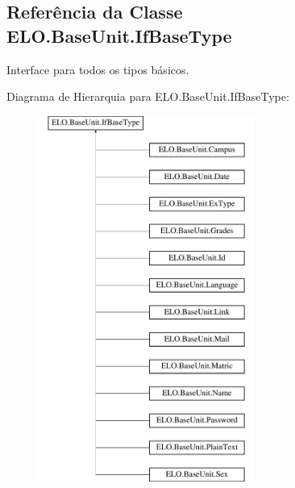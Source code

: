 \hypertarget{classELO_1_1BaseUnit_1_1IfBaseType}{\subsection{Referência da Classe E\-L\-O.\-Base\-Unit.\-If\-Base\-Type}
\label{classELO_1_1BaseUnit_1_1IfBaseType}
}


Interface para todos os tipos básicos.  


Diagrama de Hierarquia para E\-L\-O.\-Base\-Unit.\-If\-Base\-Type\-:\begin{figure}[H]
\begin{center}
\leavevmode
\includegraphics[height=12.000000cm]{d7/d79/classELO_1_1BaseUnit_1_1IfBaseType}
\end{center}
\end{figure}
